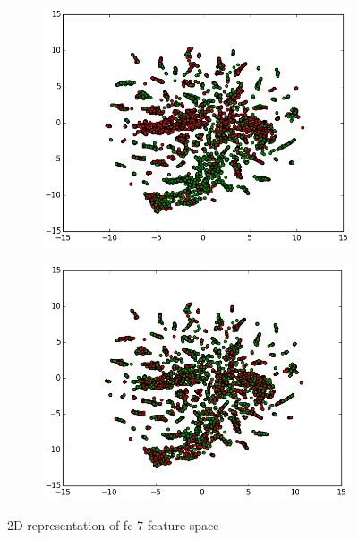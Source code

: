 \documentclass[10pt,twocolumn,letterpaper]{article}
\begin{document}
\begin{figure}
    \centering
    \hfill
    \begin{subfigure}[b]{0.49\linewidth}
        \includegraphics[width=\linewidth]{images/analysis/youth_distribution.png}
        \label{fig:youth}
    \end{subfigure}
    \hfill
    \begin{subfigure}[b]{0.49\linewidth}
        \includegraphics[width=\linewidth]{images/analysis/soft_lighting_distribution.png}
        \label{fig:softlighting}
    \end{subfigure}
    \hfill
    \caption{2D representation of fc-7 feature space}
    \label{fig:analysis}
\end{figure}
\end{document}
